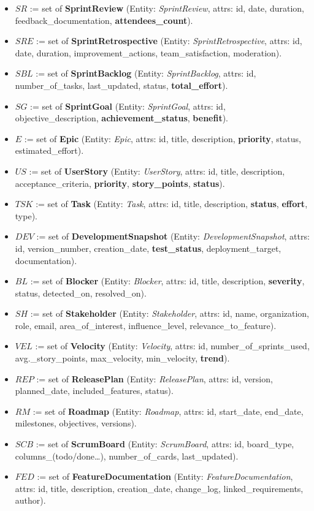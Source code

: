 \documentclass[11pt]{article}
\begin{document}
\begin{itemize}[leftmargin=2em]
  \item $SR$ := set of \textbf{SprintReview} (Entity: \emph{SprintReview}, attrs: id, date, duration, feedback\_documentation, \textbf{attendees\_count}).
  \item $SRE$ := set of \textbf{SprintRetrospective} (Entity: \emph{SprintRetrospective}, attrs: id, date, duration, improvement\_actions, team\_satisfaction, moderation).
  \item $SBL$ := set of \textbf{SprintBacklog} (Entity: \emph{SprintBacklog}, attrs: id, number\_of\_tasks, last\_updated, status, \textbf{total\_effort}).
  \item $SG$ := set of \textbf{SprintGoal} (Entity: \emph{SprintGoal}, attrs: id, objective\_description, \textbf{achievement\_status}, \textbf{benefit}).
  \item $E$ := set of \textbf{Epic} (Entity: \emph{Epic}, attrs: id, title, description, \textbf{priority}, status, estimated\_effort).
  \item $US$ := set of \textbf{UserStory} (Entity: \emph{UserStory}, attrs: id, title, description, acceptance\_criteria, \textbf{priority}, \textbf{story\_points}, \textbf{status}).
  \item $TSK$ := set of \textbf{Task} (Entity: \emph{Task}, attrs: id, title, description, \textbf{status}, \textbf{effort}, type).
  \item $DEV$ := set of \textbf{DevelopmentSnapshot} (Entity: \emph{DevelopmentSnapshot}, attrs: id, version\_number, creation\_date, \textbf{test\_status}, deployment\_target, documentation).
  \item $BL$ := set of \textbf{Blocker} (Entity: \emph{Blocker}, attrs: id, title, description, \textbf{severity}, status, detected\_on, resolved\_on).
  \item $SH$ := set of \textbf{Stakeholder} (Entity: \emph{Stakeholder}, attrs: id, name, organization, role, email, area\_of\_interest, influence\_level, relevance\_to\_feature).
  \item $VEL$ := set of \textbf{Velocity} (Entity: \emph{Velocity}, attrs: id, number\_of\_sprints\_used, avg.\_story\_points, max\_velocity, min\_velocity, \textbf{trend}).
  \item $REP$ := set of \textbf{ReleasePlan} (Entity: \emph{ReleasePlan}, attrs: id, version, planned\_date, included\_features, status).
  \item $RM$ := set of \textbf{Roadmap} (Entity: \emph{Roadmap}, attrs: id, start\_date, end\_date, milestones, objectives, versions).
  \item $SCB$ := set of \textbf{ScrumBoard} (Entity: \emph{ScrumBoard}, attrs: id, board\_type, columns\_(todo/done\ldots), number\_of\_cards, last\_updated).
  \item $FED$ := set of \textbf{FeatureDocumentation} (Entity: \emph{FeatureDocumentation}, attrs: id, title, description, creation\_date, change\_log, linked\_requirements, author).
\end{itemize}
\end{document}
